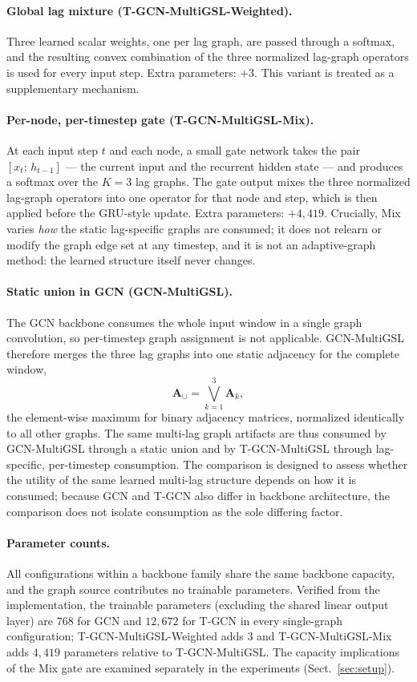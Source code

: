 \paragraph{Global lag mixture (T-GCN-MultiGSL-Weighted).}
Three learned scalar weights, one per lag graph, are passed through a softmax,
and the resulting convex combination of the three normalized lag-graph
operators is used for every input step. Extra parameters: $+3$. This variant
is treated as a supplementary mechanism.

\paragraph{Per-node, per-timestep gate (T-GCN-MultiGSL-Mix).}
At each input step $t$ and each node, a small gate network takes the pair
$[x_t;\,h_{t-1}]$ --- the current input and the recurrent hidden state --- and
produces a softmax over the $K=3$ lag graphs. The gate output mixes the three
normalized lag-graph operators into one operator for that node and step,
which is then applied before the GRU-style update. Extra parameters: $+4{,}419$.
Crucially, Mix varies \emph{how} the static lag-specific graphs are consumed;
it does not relearn or modify the graph edge set at any timestep, and it is
not an adaptive-graph method: the learned structure itself never changes.

\paragraph{Static union in GCN (GCN-MultiGSL).}
The GCN backbone consumes the whole input window in a single graph
convolution, so per-timestep graph assignment is not applicable. GCN-MultiGSL
therefore merges the three lag graphs into one static adjacency for the
complete window,
\[
\mathbf{A}_{\cup} = \bigvee_{k=1}^{3} \mathbf{A}_k,
\]
the element-wise maximum for binary adjacency matrices, normalized identically
to all other graphs. The same multi-lag graph artifacts are thus consumed by
GCN-MultiGSL through a static union and by T-GCN-MultiGSL through
lag-specific, per-timestep consumption. The comparison is designed to assess
whether the utility of the same learned multi-lag structure depends on how it
is consumed; because GCN and T-GCN also differ in backbone architecture, the
comparison does not isolate consumption as the sole differing factor.

\paragraph{Parameter counts.}
All configurations within a backbone family share the same backbone capacity,
and the graph source contributes no trainable parameters. Verified from the
implementation, the trainable parameters (excluding the shared linear output
layer) are $768$ for GCN and $12{,}672$ for T-GCN in every single-graph
configuration; T-GCN-MultiGSL-Weighted adds $3$ and T-GCN-MultiGSL-Mix adds
$4{,}419$ parameters relative to T-GCN-MultiGSL. The capacity implications of
the Mix gate are examined separately in the experiments
(Sect.~\ref{sec:setup}).
